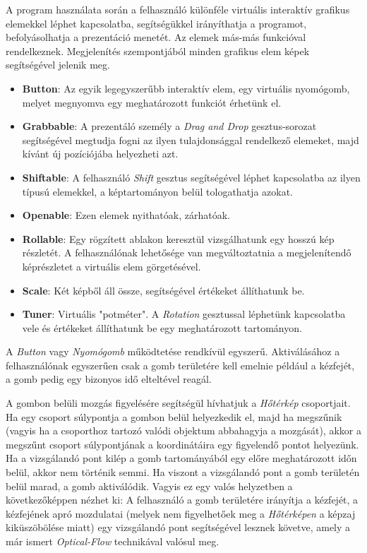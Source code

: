 

A program használata során a felhasználó különféle virtuális interaktív grafikus elemekkel léphet kapcsolatba, segítségükkel irányíthatja a programot, befolyásolhatja a prezentáció menetét. Az elemek más-más funkcióval rendelkeznek. Megjelenítés szempontjából minden grafikus elem képek segítségével jelenik meg.

\begin{itemize}
	\item \textbf{Button}: Az egyik legegyszerűbb interaktív elem, egy virtuális nyomógomb, melyet megnyomva egy meghatározott funkciót érhetünk el.
	\item \textbf{Grabbable}: A prezentáló személy a \textit{Drag and Drop} gesztus-sorozat segítségével megtudja fogni az ilyen tulajdonsággal rendelkező elemeket, majd kívánt új pozíciójába helyezheti azt.
	\item \textbf{Shiftable}: A felhasználó \textit{Shift} gesztus segítségével léphet kapcsolatba az ilyen típusú elemekkel, a képtartományon belül tologathatja azokat.
	\item \textbf{Openable}: Ezen elemek nyithatóak, zárhatóak.
	\item \textbf{Rollable}: Egy rögzített ablakon keresztül vizsgálhatunk egy hosszú kép részletét. A felhasználónak lehetősége van megváltoztatnia a megjelenítendő képrészletet a virtuális elem görgetésével.
	\item \textbf{Scale}: Két képből áll össze, segítségével értékeket állíthatunk be.
	\item \textbf{Tuner}: Virtuális "potméter". A \textit{Rotation} gesztussal léphetünk kapcsolatba vele és értékeket állíthatunk be egy meghatározott tartományon.
\end{itemize} 


A \textit{Button} vagy \textit{Nyomógomb} működtetése rendkívül egyszerű. Aktiválásához a felhasználónak egyszerűen csak a gomb területére kell emelnie például a kézfejét, a gomb pedig egy bizonyos idő elteltével reagál.

A gombon belüli mozgás figyelésére segítségül hívhatjuk a \textit{Hőtérkép} csoportjait. Ha egy csoport súlypontja a gombon belül helyezkedik el, majd ha megszűnik (vagyis ha a csoporthoz tartozó valódi objektum abbahagyja a mozgását), akkor a megszűnt csoport súlypontjának a koordinátáira egy figyelendő pontot helyezünk. Ha a vizsgálandó pont kilép a gomb tartományából egy előre meghatározott időn belül, akkor nem történik semmi. Ha viszont a vizsgálandó pont a gomb területén belül marad, a gomb aktiválódik. 
Vagyis ez egy valós helyzetben a következőképpen nézhet ki: A felhasználó a gomb területére irányítja a kézfejét, a kézfejének apró mozdulatai (melyek nem figyelhetőek meg a \textit{Hőtérképen} a képzaj kiküszöbölése miatt) egy vizsgálandó pont segítségével lesznek követve, amely a már ismert \textit{Optical-Flow} technikával valósul meg.

